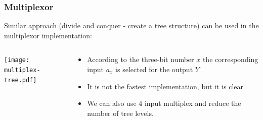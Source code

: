 \documentclass{beamer}
\begin{document}
\begin{frame}
\frametitle{Multiplexor}

Similar approach (divide and conquer - create a tree structure) can be used in the multiplexor implementation:
\begin{columns}
\begin{column}{0.5\textwidth}
\begin{center}
   \texttt{[image: multiplex-tree.pdf]}
\end{center}
\end{column}
\begin{column}{0.5\textwidth}
\begin{itemize}
\item According to the three-bit number $x$ the corresponding input $a_x$ is selected for the output $Y$
\item It is not the fastest implementation, but it is clear
\item We can also use 4 input multiplex and reduce the number of tree levels.
\end{itemize}

\end{column}
\end{columns}

\end{frame}
\end{document}
